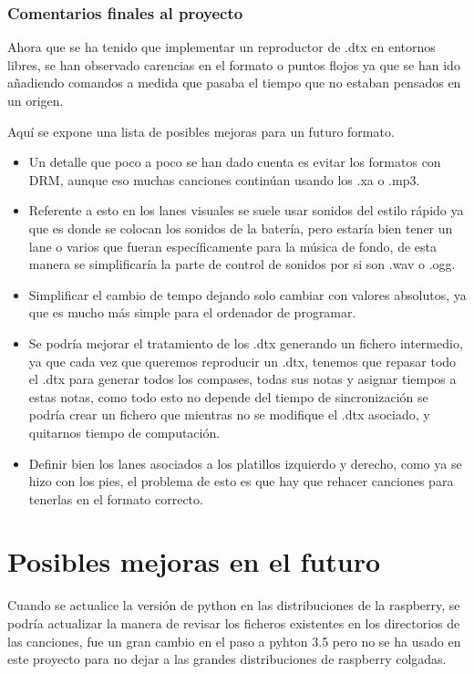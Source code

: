 \documentclass[a4paper,11pt,oneside]{book}
\begin{document}
\subsection{Comentarios finales al proyecto}
Ahora que se ha tenido que implementar un reproductor de .dtx en entornos libres, se han observado carencias en el formato o puntos flojos ya que se han ido añadiendo comandos a medida que pasaba el tiempo que no estaban pensados en un origen.

Aquí se expone una lista de posibles mejoras para un futuro formato.

\begin{itemize}
  \item Un detalle que poco a poco se han dado cuenta es evitar los formatos con DRM, aunque eso muchas canciones continúan usando los .xa o .mp3. 
  \item Referente a esto en los lanes visuales se suele usar sonidos del estilo rápido ya que es donde se colocan los sonidos de la batería, pero estaría bien tener un lane o varios que fueran específicamente para la música de fondo, de esta manera se simplificaría la parte de control de sonidos por si son .wav o .ogg.
  \item Simplificar el cambio de tempo dejando solo cambiar con valores absolutos, ya que es mucho más simple para el ordenador de programar.
  \item Se podría mejorar el tratamiento de los .dtx generando un fichero intermedio, ya que cada vez que queremos reproducir un .dtx, tenemos que repasar todo el .dtx para generar todos los compases, todas sus notas y asignar tiempos a estas notas, como todo esto no depende del tiempo de sincronización se podría crear un fichero que mientras no se modifique el .dtx asociado, y quitarnos tiempo de computación.
  \item Definir bien los lanes asociados a los platillos izquierdo y derecho, como ya se hizo con los pies, el problema de esto es que hay que rehacer canciones para tenerlas en el formato correcto.
\end{itemize}

\chapter{Posibles mejoras en el futuro}

Cuando se actualice la versión de python en las distribuciones de la raspberry, se podría actualizar la manera de revisar los ficheros existentes en los directorios de las canciones, fue un gran cambio en el paso a pyhton 3.5 pero no se ha usado en este proyecto para no dejar a las grandes distribuciones de raspberry colgadas.
\end{document}

